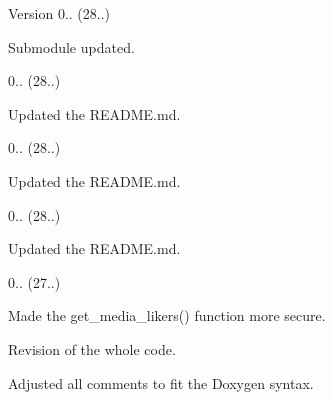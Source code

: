 \begin{DoxyVersion}{Version}
0.. (28..)
\begin{DoxyItemize}
\item Submodule updated. 
\end{DoxyItemize}

0.. (28..)
\begin{DoxyItemize}
\item Updated the R\+E\+A\+D\+M\+E.\+md. 
\end{DoxyItemize}

0.. (28..)
\begin{DoxyItemize}
\item Updated the R\+E\+A\+D\+M\+E.\+md. 
\end{DoxyItemize}

0.. (28..)
\begin{DoxyItemize}
\item Updated the R\+E\+A\+D\+M\+E.\+md. 
\end{DoxyItemize}

0.. (27..)
\begin{DoxyItemize}
\item Made the get\+\_\+media\+\_\+likers() function more secure.
\item Revision of the whole code.
\item Adjusted all comments to fit the Doxygen syntax. 
\end{DoxyItemize}
\end{DoxyVersion}
